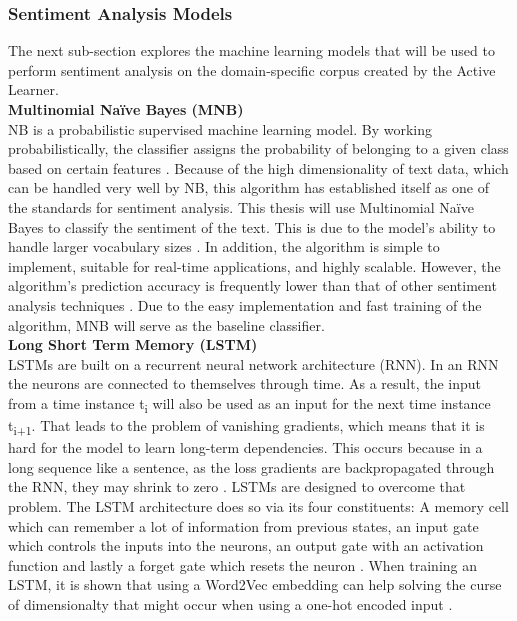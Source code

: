 \documentclass[11pt, a4paper]{article}
\begin{document}
\subsubsection{Sentiment Analysis Models}
The next sub-section explores the machine learning models that will be used to perform sentiment analysis on the domain-specific corpus created by the Active Learner. \\

\noindent\textbf{Multinomial Naïve Bayes (MNB)}\\
NB is a probabilistic supervised machine learning model. By working probabilistically, the classifier assigns the probability of 
belonging to a given class based on certain features \citep{jemai2021SentimentAnalysis}. Because of the high dimensionality of text data, 
which can be handled very well by NB, this algorithm has established itself as one of the standards for sentiment analysis. 
This thesis will use Multinomial Naïve Bayes to classify the sentiment of the text. This is due to the model's ability to handle 
larger vocabulary sizes \citep{abbas2019mnb}. In addition, the algorithm is simple to implement, suitable for real-time applications, and highly scalable. 
However, the algorithm's prediction accuracy is frequently lower than that of other sentiment analysis techniques \citep{song2017novelclassification}. 
Due to the easy implementation and fast training of the algorithm, MNB will serve as the baseline classifier.\\

\noindent\textbf{Long Short Term Memory (LSTM)}\\
LSTMs are built on a recurrent neural network architecture (RNN). In an RNN the neurons are connected to themselves through time. 
As a result, the input from a time instance t\textsubscript{i} will also be used as an input for the next time instance t\textsubscript{i+1}. That leads to the 
problem of vanishing gradients, which means that it is hard for the model to learn long-term dependencies. This occurs because
in a long sequence like a sentence, as the loss gradients are backpropagated through the RNN, they may shrink to zero \citep{vanishinggradients2020pmlr}.
LSTMs are designed to overcome that problem.
The LSTM architecture does so via its four constituents: A memory cell which can remember a lot of information 
from previous states, an input gate which controls the inputs into the neurons, an output gate with an activation function 
and lastly a forget gate which resets the neuron \citep{priyantina2019sentimentanalysishotel}. When training an LSTM, it is shown that
using a Word2Vec embedding can help solving the curse of dimensionalty that might occur when using a one-hot encoded input \citep{xiao2018word2veclstm}.\\
\end{document}
